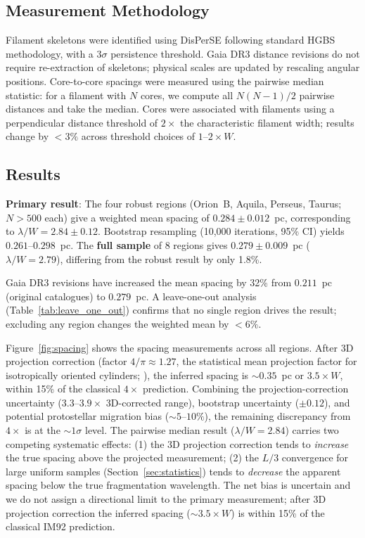 \documentclass[twoside,twocolumn]{mnras}
\begin{document}
\subsection{Measurement Methodology}

Filament skeletons were identified using DisPerSE \citep{Sousbie2011} following standard
HGBS methodology, with a $3\sigma$ persistence threshold. Gaia DR3 distance revisions
do not require re-extraction of skeletons; physical scales are updated by rescaling
angular positions. Core-to-core spacings were measured using the pairwise median
statistic: for a filament with $N$ cores, we compute all $N(N-1)/2$ pairwise distances
and take the median. Cores were associated with filaments using a perpendicular
distance threshold of $2\times$ the characteristic filament width; results change
by $<3\%$ across threshold choices of $1$--$2\times W$.

\subsection{Results}
\label{sec:results}

\textbf{Primary result}: The four robust regions (Orion~B, Aquila, Perseus, Taurus;
$N > 500$ each) give a weighted mean spacing of $0.284 \pm 0.012$~pc,
corresponding to $\lambda/W = 2.84 \pm 0.12$. Bootstrap resampling (10,000 iterations,
95\% CI) yields $0.261$--$0.298$~pc. The \textbf{full sample} of 8 regions gives
$0.279 \pm 0.009$~pc ($\lambda/W = 2.79$), differing from the robust result by
only 1.8\%.

Gaia DR3 revisions have increased the mean spacing by 32\% from $0.211$~pc (original
catalogues) to $0.279$~pc. A leave-one-out analysis (Table~\ref{tab:leave_one_out})
confirms that no single region drives the result; excluding any region changes
the weighted mean by $<6\%$.

Figure~\ref{fig:spacing} shows the spacing measurements across all regions.
After 3D projection correction (factor $4/\pi \approx 1.27$, the statistical mean
projection factor for isotropically oriented cylinders; \citealt{Andre2010}),
the inferred spacing is ${\sim}0.35$~pc or $3.5\times W$,
within 15\% of the classical $4\times$ prediction. Combining the projection-correction
uncertainty ($3.3$--$3.9\times$ 3D-corrected range), bootstrap uncertainty ($\pm 0.12$),
and potential protostellar migration bias ($\sim 5$--$10\%$), the remaining discrepancy
from $4\times$ is at the ${\sim}1\sigma$ level. The pairwise median result ($\lambda/W = 2.84$) carries two competing systematic effects:
(1) the 3D projection correction tends to \textit{increase} the true spacing above the
projected measurement; (2) the $L/3$ convergence for large uniform samples
(Section~\ref{sec:statistics}) tends to \textit{decrease} the apparent spacing below the
true fragmentation wavelength. The net bias is uncertain and we do not assign a directional
limit to the primary measurement; after 3D projection correction the inferred spacing
(${\sim}3.5\times W$) is within 15\% of the classical IM92 prediction.
\end{document}
